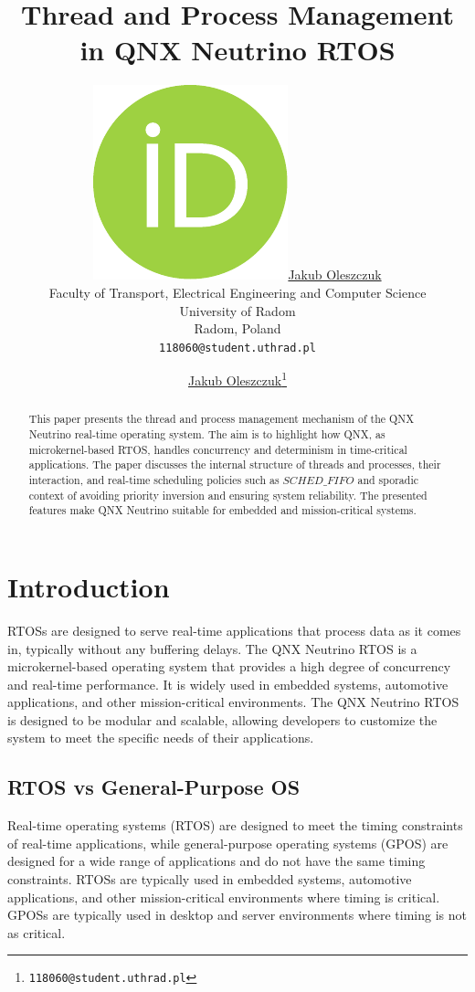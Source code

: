 \documentclass{article}
\title{Thread and Process Management in QNX Neutrino RTOS}
\author{ 
	\href{https://orcid.org/0009-0000-3709-0802}{\includegraphics[scale=0.06]{orcid.pdf}\hspace{1mm}Jakub Oleszczuk} \\
	Faculty of Transport, Electrical Engineering and Computer Science\\
	University of Radom\\
	Radom, Poland \\
	\texttt{118060@student.uthrad.pl} \\
}
\author[1]{%
	\href{https://orcid.org/0009-0000-3709-0802}{\usebox{\orcid}\hspace{1mm}Jakub Oleszczuk\thanks{\texttt{118060@student.uthrad.pl}}}%
}
\affil[1]{Faculty of Transport, Electrical Engineering and Computer Science, University of Radom, Radom,26-600, Poland}
\begin{document}
\maketitle

\begin{abstract}
	\label{sec:abstract}

	This paper presents the thread and process management mechanism of the QNX Neutrino real-time operating system.
	The aim is to highlight how QNX, as microkernel-based RTOS, handles concurrency and determinism in time-critical applications.
	The paper discusses the internal structure of threads and processes, their interaction, and real-time scheduling policies such as $SCHED\_FIFO$
	and sporadic context of avoiding priority inversion and ensuring system reliability. The presented features make QNX Neutrino suitable for
	embedded and mission-critical systems.

\end{abstract}




\section{Introduction}
\label{sec:intro}
RTOSs are designed to serve real-time applications that process data as it comes in, typically without any buffering delays.
The QNX Neutrino RTOS \cite{WhatsRTOS2024} is a microkernel-based operating system that provides a high degree of concurrency and real-time performance.
It is widely used in embedded systems, automotive applications, and other mission-critical environments.
The QNX Neutrino RTOS is designed to be modular and scalable, allowing developers to customize the system to meet the specific needs of their applications.
\FloatBarrier
\subsection{RTOS vs General-Purpose OS}
\label{sec:rtos-vs-gpos}
Real-time operating systems (RTOS) are designed to meet the timing constraints of real-time applications, while general-purpose operating systems (GPOS) are designed for a wide range of applications and do not have the same timing constraints.
RTOSs are typically used in embedded systems, automotive applications, and other mission-critical environments where timing is critical.
GPOSs are typically used in desktop and server environments where timing is not as critical.\cite{WhatsRTOS2024}
\end{document}
